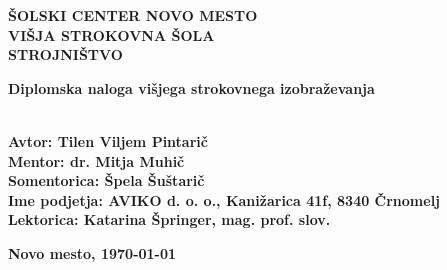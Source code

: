 \begin{titlepage}
	\begin{center}
		\textbf{\fontsize{20}{36}\selectfont
			ŠOLSKI CENTER NOVO MESTO\\
			VIŠJA STROKOVNA ŠOLA\\
			STROJNIŠTVO\\
		}

		\vspace*{3.2cm}
		\textbf{\fontsize{18}{32}\selectfont
			Diplomska naloga višjega strokovnega izobraževanja\\
			\vspace*{1cm}
			\fontsize{26}{39}\selectfont \MakeUppercase{\thetitle}\\
		}

	\end{center}

	\vfill

	\textbf{\fontsize{14}{21}\selectfont
		Avtor: Tilen Viljem Pintarič \\
		Mentor: dr. Mitja Muhič \\
		Somentorica: Špela Šuštarič \\
		Ime podjetja: AVIKO d. o. o., Kanižarica 41f, 8340 Črnomelj \\
		Lektorica: Katarina Špringer, mag. prof. slov.
	}

	\textbf{\fontsize{14}{21}\selectfont
		\hfill
		Novo mesto,
		\monthyeardate\today
	}
\end{titlepage}